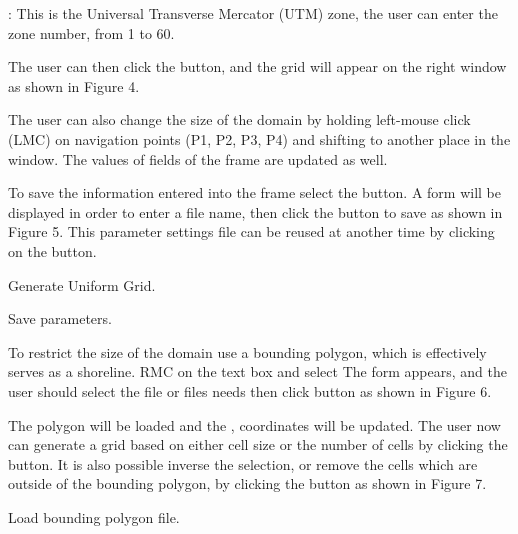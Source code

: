 \documentclass[letterpaper,10pt,english]{sphinxmanual}
\begin{document}
: This is the Universal Transverse Mercator (UTM) zone, the
user can enter the zone number, from 1 to 60.

The user can then click the  button, and the grid will appear
on the right window as shown in Figure 4.

The user can also change the size of the domain by holding left-mouse
click (LMC) on navigation points (P1, P2, P3, P4) and shifting to
another place in the window. The values of fields of the  frame are updated as well.

To save the information entered into the  frame
select the  button. A  form will be displayed
in order to enter a file name, then click the  button to save as
shown in Figure 5. This parameter settings file can be reused at another
time by clicking on the  button.


 Generate Uniform Grid.


 Save parameters.

To restrict the size of the domain use a bounding polygon, which is
effectively serves as a shoreline. RMC on the  text
box and select  The  form appears, and the user should
select the file or files needs then click  button as shown in
Figure 6.

The polygon will be loaded and the , 
coordinates will be updated. The user now can generate a grid based on
either cell size or the number of cells by clicking the 
button. It is also possible inverse the selection, or remove the cells
which are outside of the bounding polygon, by clicking the 
button as shown in Figure 7.


 Load bounding polygon file.
\end{document}
